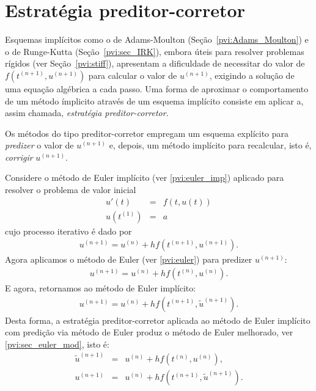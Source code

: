 \section{Estratégia preditor-corretor}
Esquemas implícitos como o de Adams-Moulton (Seção~\ref{pvi:Adams_Moulton}) e o de Runge-Kutta (Seção~\ref{pvi:sec_IRK}), embora úteis para resolver problemas rígidos (ver Seção~\ref{pvi:stiff}), apresentam a dificuldade de necessitar do valor de $f(t^{(n+1)},u^{(n+1)})$ para calcular o valor de $u^{(n+1)}$, exigindo a solução de uma equação algébrica a cada passo. Uma forma de aproximar o comportamento de um método ímplicito através de um esquema implícito consiste em aplicar a, assim chamada, \emph{estratégia preditor-corretor}.

Os métodos do tipo preditor-corretor empregam um esquema explícito para \emph{predizer} o valor de $u^{(n+1)}$ e, depois, um método implícito para recalcular, isto é, \emph{corrigir} $u^{(n+1)}$.

\begin{ex} Considere o método de Euler implícito (ver \ref{pvi:euler_imp}) aplicado para resolver  o problema de valor inicial
\begin{eqnarray*}
  u'(t)  &=& f(t,u(t)) \\
  u(t^{(1)}) &=& a
\end{eqnarray*}
cujo processo iterativo é dado por
\begin{eqnarray*}
u^{(n+1)}=u^{(n)} + h f(t^{(n+1)},u^{(n+1)}).
\end{eqnarray*}
Agora aplicamos o método de Euler (ver \ref{pvi:euler}) para predizer $u^{(n+1)}$:
\begin{eqnarray*}
u^{(n+1)}=u^{(n)} + h f(t^{(n)},u^{(n)}).
\end{eqnarray*}
E agora, retornamos ao método de Euler implícito:
\begin{eqnarray*}
u^{(n+1)}=u^{(n)} + h f(t^{(n+1)},\tilde{u}^{(n+1)}).
\end{eqnarray*}
Desta forma, a estratégia preditor-corretor aplicada ao método de Euler implícito com predição via método de Euler produz o método de Euler melhorado, ver \ref{pvi:sec_euler_mod}, isto é:
\begin{eqnarray*}
\tilde{u}^{(n+1)}&=&u^{(n)} + h f(t^{(n)},u^{(n)}),\\
u^{(n+1)}&=&u^{(n)} + h f(t^{(n+1)},\tilde{u}^{(n+1)}).
\end{eqnarray*}
\end{ex}


